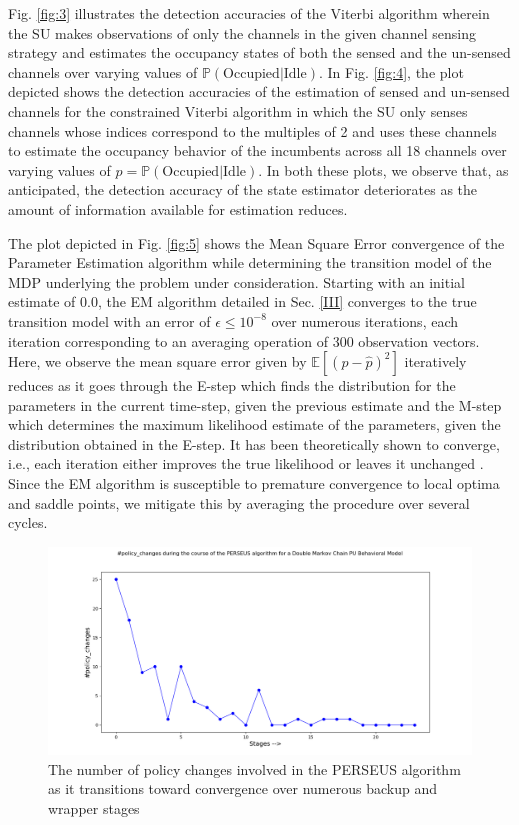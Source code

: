 \documentclass[10pt,twocolumn]{IEEEtran}
\begin{document}
Fig. \ref{fig:3} illustrates the detection accuracies of the Viterbi algorithm wherein the SU makes observations of only the channels in the given channel sensing strategy and estimates the occupancy states of both the sensed and the un-sensed channels over varying values of $\mathbb{P}(\text{Occupied}|\text{Idle})$. In Fig. \ref{fig:4}, the plot depicted shows the detection accuracies of the estimation of sensed and un-sensed channels for the constrained Viterbi algorithm in which the SU only senses channels whose indices correspond to the multiples of 2 and uses these channels to estimate the occupancy behavior of the incumbents across all 18 channels over varying values of $p = \mathbb{P}(\text{Occupied}|\text{Idle})$. In both these plots, we observe that, as anticipated, the detection accuracy of the state estimator deteriorates as the amount of information available for estimation reduces. 

The plot depicted in Fig. \ref{fig:5} shows the Mean Square Error convergence of the Parameter Estimation algorithm while determining the transition model of the MDP underlying the problem under consideration. Starting with an initial estimate of 0.0, the EM algorithm detailed in Sec. \ref{III} converges to the true transition model  with an error of $\epsilon \leq 10^{-8}$ over numerous iterations, each iteration corresponding to an averaging operation of 300 observation vectors. Here, we observe the mean square error given by $\mathbb{E}[(p - \hat{p})^{2}]$ iteratively reduces as it goes through the E-step which finds the distribution for the parameters in the current time-step, given the previous estimate and the M-step which determines the maximum likelihood estimate of the parameters, given the distribution obtained in the E-step. It has been theoretically shown to converge, i.e., each iteration either improves the true likelihood or leaves it unchanged \cite{Neal1998}. Since the EM algorithm is susceptible to premature convergence to local optima and saddle points, we mitigate this by averaging the procedure over several cycles.
\begin{figure}
\centering
\includegraphics[scale=0.25]{Policy_Changes_Plot_04112019.png}
\caption{The number of policy changes involved in the PERSEUS algorithm as it transitions toward convergence over numerous backup and wrapper stages}
\label{fig:7}
\end{figure}
\end{document}
